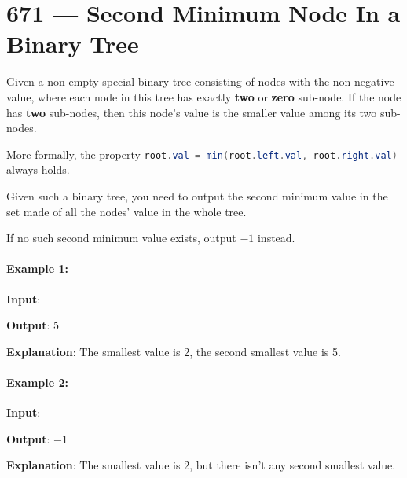 \section{671 --- Second Minimum Node In a Binary Tree}
Given a non-empty special binary tree consisting of nodes with the non-negative value, where each node in this tree has exactly \textbf{two} or \textbf{zero} sub-node. If the node has \textbf{two} sub-nodes, then this node's value is the smaller value among its two sub-nodes. 

More formally, the property \lstinline[language=Java, basicstyle=\small\ttfamily, keywordstyle=\bfseries\color{green!40!black}]|root.val = min(root.left.val, root.right.val)| always holds.

Given such a binary tree, you need to output the second minimum value in the set made of all the nodes' value in the whole tree.

If no such second minimum value exists, output $-1$ instead.

\paragraph{Example 1:}

\begin{flushleft}

\textbf{Input}:
\begin{figure}[H]
\end{figure} 

\textbf{Output}: 5

\textbf{Explanation}: The smallest value is 2, the second smallest value is 5.

\end{flushleft} 

\paragraph{Example 2:}

\begin{flushleft}

\textbf{Input}: 

\begin{figure}[H]
\end{figure}

\textbf{Output}: $-1$

\textbf{Explanation}: The smallest value is 2, but there isn't any second smallest value.
\end{flushleft}


